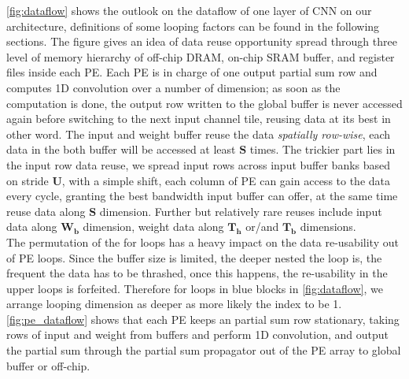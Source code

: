 \autoref{fig:dataflow} shows the outlook on the dataflow of one layer of CNN on our architecture, definitions of some looping factors can be found in the following sections. The figure gives an idea of data reuse opportunity spread through three level of memory hierarchy of off-chip DRAM, on-chip SRAM buffer, and register files inside each PE. Each PE is in charge of one output partial sum row and computes 1D convolution over a number of dimension; as soon as the computation is done, the output row written to the global buffer is never accessed again before switching to the next input channel tile, reusing data at its best in other word. The input and weight buffer reuse the data \textit{spatially row-wise}, each data in the both buffer will be accessed at least $\boldsymbol{S}$ times. The trickier part lies in the input row data reuse, we spread input rows across input buffer banks based on stride $\boldsymbol{U}$, with a simple shift, each column of PE can gain access to the data every cycle, granting the best bandwidth input buffer can offer, at the same time reuse data along $\boldsymbol{S}$ dimension. Further but relatively rare reuses include input data along $\boldsymbol{W_b}$ dimension, weight data along $\boldsymbol{T_h}$ or/and $\boldsymbol{T_b}$ dimensions.  \\
The permutation of the for loops has a heavy impact on the data re-usability out of PE loops. Since the buffer size is limited, the deeper nested the loop is, the frequent the data has to be thrashed, once this happens, the re-usability in the upper loops is forfeited. Therefore for loops in blue blocks in \autoref{fig:dataflow}, we arrange looping dimension as deeper as more likely the index to be 1. \\
\autoref{fig:pe_dataflow} shows that each PE keeps an partial sum row stationary, taking rows of input and weight from buffers and perform 1D convolution, and output the partial sum through the partial sum propagator out of the PE array to global buffer or off-chip. 
